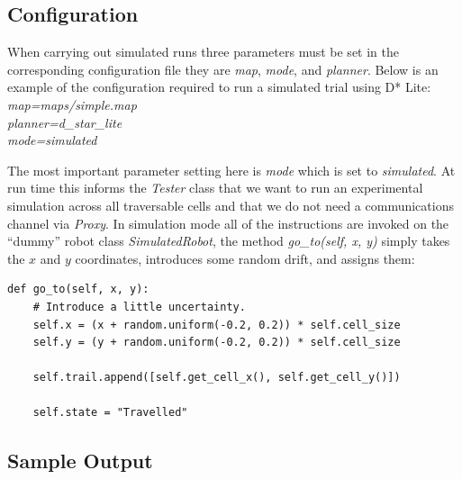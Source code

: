 \subsection{Configuration}
\noindent 
When carrying out simulated runs three parameters must be set in the corresponding configuration file they are \textit{map}, \textit{mode}, and \textit{planner}. Below is an example of the configuration required to run a simulated trial using D* Lite: \\

	\indent \textit{map=maps/simple.map \\}
	\indent \textit{planner=d\_star\_lite \\}
	\indent \textit{mode=simulated \\}

\noindent
The most important parameter setting here is \textit{mode} which is set to \textit{simulated}. At run time this informs the \textit{Tester} class that we want to run an experimental simulation across all traversable cells and that we do not need a communications channel via \textit{Proxy}. In simulation mode all of the instructions are invoked on the ``dummy'' robot class \textit{SimulatedRobot}, the method \textit{go\_to(self, x, y)} simply takes the $x$ and $y$ coordinates, introduces some random drift, and assigns them: \\

\begin{lstlisting}
def go_to(self, x, y):
	# Introduce a little uncertainty.
    self.x = (x + random.uniform(-0.2, 0.2)) * self.cell_size  
    self.y = (y + random.uniform(-0.2, 0.2)) * self.cell_size
    
    self.trail.append([self.get_cell_x(), self.get_cell_y()])
    
    self.state = "Travelled"
\end{lstlisting}

\subsection{Sample Output}

